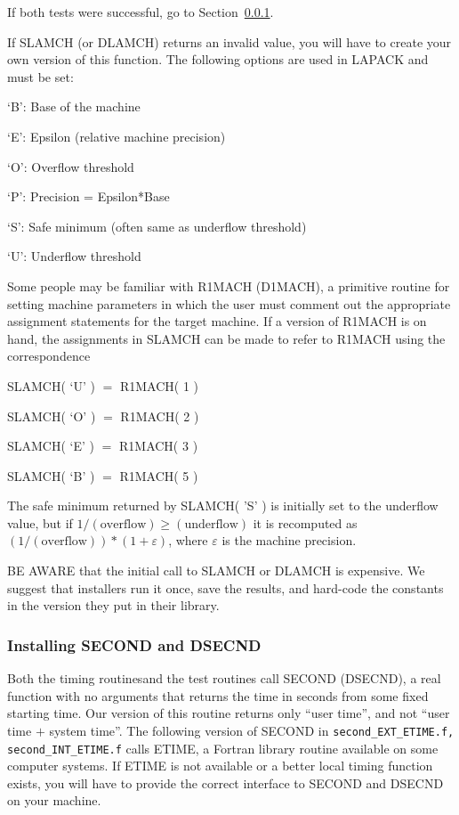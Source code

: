 \documentclass[11pt]{report}
\begin{document}
If both tests were successful, go to Section~\ref{second}.

If SLAMCH (or DLAMCH) returns an invalid value, you will have to create
your own version of this function.  The following options are used in
LAPACK and must be set:

\begin{list}{}{}
\item {`B': }  Base of the machine
\item {`E': }  Epsilon (relative machine precision)
\item {`O': }  Overflow threshold
\item {`P': }  Precision = Epsilon*Base
\item {`S': }  Safe minimum (often same as underflow threshold)
\item {`U': }  Underflow threshold
\end{list}

Some people may be familiar with R1MACH (D1MACH), a primitive
routine for setting machine parameters in which the user must
comment out the appropriate assignment statements for the target
machine.  If a version of R1MACH is on hand, the assignments in
SLAMCH can be made to refer to R1MACH using the correspondence

\begin{list}{}{}
\item {SLAMCH( `U' )}  $=$ R1MACH( 1 )
\item {SLAMCH( `O' )}  $=$ R1MACH( 2 )
\item {SLAMCH( `E' )}  $=$ R1MACH( 3 )
\item {SLAMCH( `B' )}  $=$ R1MACH( 5 )
\end{list}

\noindent
The safe minimum returned by SLAMCH( 'S' ) is initially set to the
underflow value, but if $1/(\mathrm{overflow}) \geq (\mathrm{underflow})$
it is recomputed as $(1/(\mathrm{overflow})) * ( 1 + \varepsilon )$,
where $\varepsilon$ is the machine precision.

BE AWARE that the initial call to SLAMCH or DLAMCH is expensive.  
We suggest that installers run it once, save the results, and hard-code
the constants in the version they put in their library.

\subsubsection{Installing SECOND and DSECND}\label{second}

Both the timing routines\footnotemark[\value{footnote}]  and the test routines call SECOND
(DSECND), a real function with no arguments that returns the time
in seconds from some fixed starting time.
Our version of this routine 
returns only ``user time'', and not ``user time $+$ system time''. 
The following version of SECOND in \texttt{second\_EXT\_ETIME.f, second\_INT\_ETIME.f} calls 
ETIME, a Fortran library routine available on some computer systems.
If ETIME is not available or a better local timing function exists,
you will have to provide the correct interface to SECOND and DSECND
on your machine.
\end{document}
